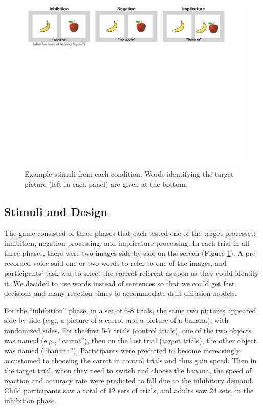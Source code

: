 \documentclass[10pt,letterpaper]{article}
\begin{document}
\begin{figure}[t]
\begin{centering}
\includegraphics[width=\textwidth]{figures/stimuli.pdf}
\caption{\label{fig:stimuli} Example stimuli from each condition. Words identifying the target picture (left in each panel) are given at the bottom.}
\end{centering}
\end{figure}

\subsection{Stimuli and Design}

The game consisted of three phases that each tested one of the target processes: inhibition, negation processing, and implicature processing.  In each trial in all three phases, there were two images side-by-side on the screen (Figure \ref{fig:stimuli}). A pre-recorded voice said one or two words to refer to one of the images, and participants' task was to select the correct referent as soon as they could identify it. We decided to use words instead of sentences so that we could get fast decisions and many reaction times to accommodate drift diffusion models. 

For the ``inhibition'' phase, in a set of 6-8 trials, the same two pictures appeared side-by-side (e.g., a picture of a carrot and a picture of a banana), with randomized sides. For the first 5-7 trials (control trials), one of the two objects was named (e.g., ``carrot''), then on the last trial  (target trials), the other object was named (``banana''). Participants were predicted to become increasingly accustomed to choosing the carrot in control trials and thus gain speed. Then in the target trial, when they need to switch and choose the banana, the speed of reaction and accuracy rate were predicted to fall due to the inhibitory demand. Child participants saw a total of 12 sets of trials, and adults saw 24 sets, in the inhibition phase.
\end{document}
